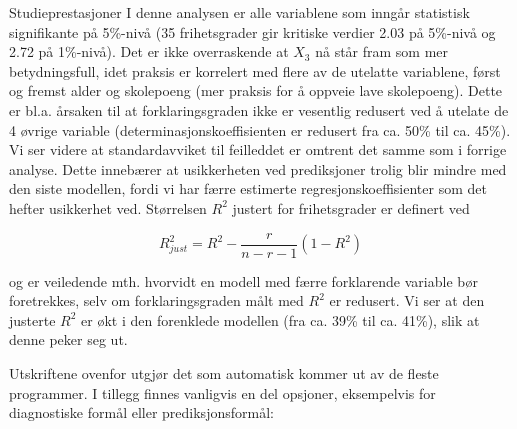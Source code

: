\begin{eksempel}{Studieprestasjoner}
\noindent I denne analysen er alle variablene som inngår statistisk
 signifikante 
på 5\%-nivå (35 frihetsgrader gir kritiske verdier 2.03 på
 5\%-nivå og 2.72 på 1\%-nivå).  Det er ikke overraskende at $X_3$
nå står fram som mer betydningsfull, idet praksis er korrelert med
flere av de utelatte variablene, først og fremst alder og skolepoeng
(mer praksis for å oppveie lave skolepoeng).  Dette er bl.a. årsaken
til at forklaringsgraden ikke er vesentlig redusert ved å utelate de 4
øvrige variable (determinasjonskoeffisienten er redusert fra ca. 50\% til
ca. 45\%).  Vi ser videre at standardavviket til feilleddet er omtrent det
samme som i forrige analyse.  Dette innebærer at usikkerheten ved
prediksjoner trolig blir mindre med den siste modellen, fordi vi har færre
estimerte regresjonskoeffisienter som det hefter usikkerhet ved. 
Størrelsen $R^2$ justert for frihetsgrader er definert ved

\[  R_{just}^2=R^2-\frac{r}{n-r-1}(1-R^2)    \]

\noindent og er veiledende mth. hvorvidt en modell med færre forklarende variable
bør foretrekkes, selv om forklaringsgraden målt med $R^2$ er redusert.
Vi ser at den justerte $R^2$ er økt i den forenklede modellen (fra ca. 39\%
til ca. 41\%), slik at denne peker seg ut.

Utskriftene ovenfor utgjør det som automatisk kommer ut av de fleste
programmer.  I tillegg finnes vanligvis en del opsjoner, eksempelvis for
diag\-nostiske formål eller prediksjonsformål:

 
\begin{center}  \end{center}



\end{eksempel}
